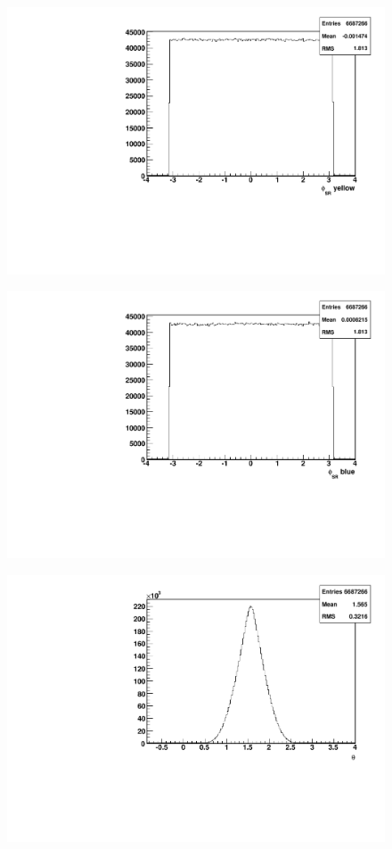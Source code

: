 \documentclass[abstract = on,listof=totoc, bibliography=totoc]{scrreprt}
\newcommand{\phirs}{\phi_{RS}}
\newcommand{\pip}{\pi^+}
\newcommand{\pim}{\pi^-}
\newcommand{\pair}{$\pip\pim$ }
\begin{document}
\begin{figure}
\begin{center}
\includegraphics[width = .8\textwidth]{hPhiSRy}
\caption[$\phirs$ distribution of \pair pair with reference to the yellow beam polarization]{}
\label{fig:}
\end{center}
\end{figure}


\begin{figure}
\begin{center}
\includegraphics[width = .8\textwidth]{hPhiSRb}
\caption[$\phirs$ distribution of \pair pair with reference to the blue beam polarization]{}
\label{fig:}
\end{center}
\end{figure}


\begin{figure}
\begin{center}
\includegraphics[width = .8\textwidth]{hTheta}
\caption[$\theta$ distribution of \pair pair]{}
\label{fig:}
\end{center}
\end{figure}
\end{document}
